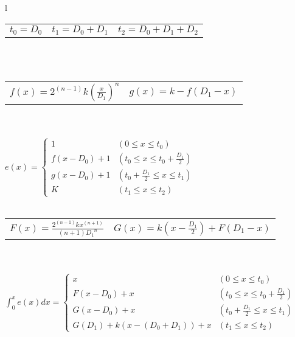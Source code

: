 \documentclass[
  border=2,
  convert={
    density=100 -alpha remove,
    outext=.png
  },
]{standalone}
\begin{document}
\begin{tabular}{l}
  \begin{tabular}{l l l}
    $\displaystyle t_0 = D_0$ &
    $\displaystyle t_1 = D_0 + D_1$ &
    $\displaystyle t_2 = D_0 + D_1 + D_2$
  \end{tabular}
  \\ \\
  \begin{tabular}{l l}
    $\displaystyle f(x) = 2^{(n-1)} k \left(\frac{x}{D_1}\right)^{n}$ &
    $\displaystyle g(x) = k - f(D_1 - x)$
  \end{tabular}
  \\ \\
  $
    \displaystyle e(x) = \begin{cases}
      1
        & (0  \leq x \leq t_0) \\
      f(x - D_0) + 1
        & \left(t_0 \leq x \leq t_0 + \frac{D_1}{2}\right) \\
      g(x - D_0) + 1
        & \left(t_0 + \frac{D_1}{2} \leq x \leq t_1\right) \\
      K
        & (t_1 \leq x \leq t_2)
    \end{cases}
  $
  \\ \\
  \begin{tabular}{l l}
    $\displaystyle F(x) = \frac{2^{(n-1)}kx^{(n+1)}}{(n+1){D_1}^{n}}$ &
    $\displaystyle G(x) = k\left(x - \frac{D_1}{2}\right) + F(D_1-x)$
  \end{tabular}
  \\ \\
  $
    \displaystyle \int_0^x e(x) dx = \begin{cases}
      x              
        & (0  \leq x \leq t_0) \\
      F(x - D_0) + x
        & \left(t_0 \leq x \leq t_0 + \frac{D_1}{2}\right) \\
      G(x - D_0) + x
        & \left(t_0 + \frac{D_1}{2} \leq x \leq t_1\right) \\
      G(D_1) + k(x - (D_0 + D_1)) + x
        & (t_1 \leq x \leq t_2)
    \end{cases}
  $ 
\end{tabular}
\end{document}
